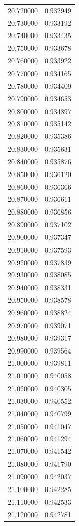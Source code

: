 \begin{tabular}{rr}
20.720000 & 0.932949 \\
20.730000 & 0.933192 \\
20.740000 & 0.933435 \\
20.750000 & 0.933678 \\
20.760000 & 0.933922 \\
20.770000 & 0.934165 \\
20.780000 & 0.934409 \\
20.790000 & 0.934653 \\
20.800000 & 0.934897 \\
20.810000 & 0.935142 \\
20.820000 & 0.935386 \\
20.830000 & 0.935631 \\
20.840000 & 0.935876 \\
20.850000 & 0.936120 \\
20.860000 & 0.936366 \\
20.870000 & 0.936611 \\
20.880000 & 0.936856 \\
20.890000 & 0.937102 \\
20.900000 & 0.937347 \\
20.910000 & 0.937593 \\
20.920000 & 0.937839 \\
20.930000 & 0.938085 \\
20.940000 & 0.938331 \\
20.950000 & 0.938578 \\
20.960000 & 0.938824 \\
20.970000 & 0.939071 \\
20.980000 & 0.939317 \\
20.990000 & 0.939564 \\
21.000000 & 0.939811 \\
21.010000 & 0.940058 \\
21.020000 & 0.940305 \\
21.030000 & 0.940552 \\
21.040000 & 0.940799 \\
21.050000 & 0.941047 \\
21.060000 & 0.941294 \\
21.070000 & 0.941542 \\
21.080000 & 0.941790 \\
21.090000 & 0.942037 \\
21.100000 & 0.942285 \\
21.110000 & 0.942533 \\
21.120000 & 0.942781 \\

\end{tabular}
